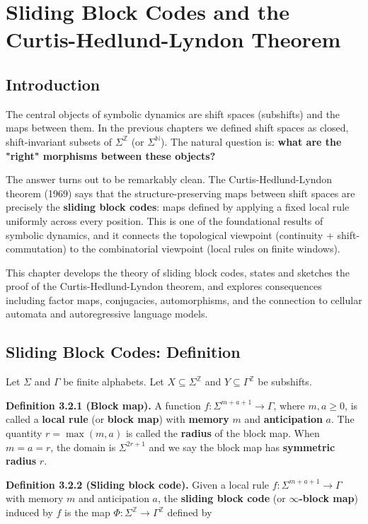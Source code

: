 \chapter{Sliding Block Codes and the Curtis-Hedlund-Lyndon Theorem}

\section{Introduction}

The central objects of symbolic dynamics are shift spaces (subshifts) and the maps between them. In the previous chapters we defined shift spaces as closed, shift-invariant subsets of $\Sigma^\mathbb{Z}$ (or $\Sigma^\mathbb{N}$). The natural question is: \textbf{what are the "right" morphisms between these objects?}

The answer turns out to be remarkably clean. The Curtis-Hedlund-Lyndon theorem (1969) says that the structure-preserving maps between shift spaces are precisely the \textbf{sliding block codes}: maps defined by applying a fixed local rule uniformly across every position. This is one of the foundational results of symbolic dynamics, and it connects the topological viewpoint (continuity + shift-commutation) to the combinatorial viewpoint (local rules on finite windows).

This chapter develops the theory of sliding block codes, states and sketches the proof of the Curtis-Hedlund-Lyndon theorem, and explores consequences including factor maps, conjugacies, automorphisms, and the connection to cellular automata and autoregressive language models.



\section{Sliding Block Codes: Definition}

Let $\Sigma$ and $\Gamma$ be finite alphabets. Let $X \subseteq \Sigma^\mathbb{Z}$ and $Y \subseteq \Gamma^\mathbb{Z}$ be subshifts.

\textbf{Definition 3.2.1 (Block map).} A function $f: \Sigma^{m+a+1} \to \Gamma$, where $m, a \geq 0$, is called a \textbf{local rule} (or \textbf{block map}) with \textbf{memory} $m$ and \textbf{anticipation} $a$. The quantity $r = \max(m, a)$ is called the \textbf{radius} of the block map. When $m = a = r$, the domain is $\Sigma^{2r+1}$ and we say the block map has \textbf{symmetric radius} $r$.

\textbf{Definition 3.2.2 (Sliding block code).} Given a local rule $f: \Sigma^{m+a+1} \to \Gamma$ with memory $m$ and anticipation $a$, the \textbf{sliding block code} (or \textbf{$\infty$-block map}) induced by $f$ is the map $\Phi: \Sigma^\mathbb{Z} \to \Gamma^\mathbb{Z}$ defined by

